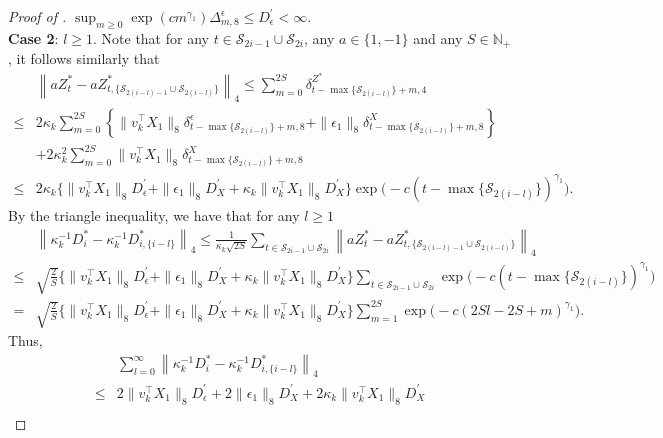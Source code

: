 \documentclass[11pt]{article}
\theoremstyle{plain}
\theoremstyle{definition}
\begin{document}
\begin{proof}[Proof of ]
    $\sup_{m \geq 0}\exp(cm^{\gamma_1})\Delta_{m, 8}^\epsilon \leq D_\epsilon^{\prime} < \infty$.
    \\
    \textbf{Case 2}: $l \geq 1$. Note that for any $t \in \mathcal{S}_{2i-1} \cup \mathcal{S}_{2i}$, any $a \in \{1,-1\}$ and any $S \in \mathbb{N}_+$, it follows similarly that
    \begin{align*}
        &\left\|aZ_{t}^* - aZ_{t, \{\mathcal{S}_{2(i-l)-1} \cup \mathcal{S}_{2(i-l)}\}}^*\right\|_{4} \leq \sum_{m = 0}^{2S}\delta^{Z^*}_{t-\max\{\mathcal{S}_{2(i-l)}\}+m, 4}\\
        \leq& 2\kappa_k\sum_{m = 0}^{2S}\left\{\|v_k^{\top}X_1\|_{8}\delta_{t-\max\{\mathcal{S}_{2(i-l)}\}+m, 8}^{\epsilon} + \|\epsilon_1\|_{8}\delta_{t-\max\{\mathcal{S}_{2(i-l)}\}+m, 8}^{X}\right\}\\
        &+ 2\kappa_k^2\sum_{m = 0}^{2S}\|v^{\top}_kX_1\|_{8}\delta_{t-\max\{\mathcal{S}_{2(i-l)}\}+m, 8}^X\\
        \leq& 2\kappa_k\big\{\|v_k^{\top}X_1\|_{8}D_{\epsilon}^{\prime} + \|\epsilon_1\|_{8}D_X^{\prime} + \kappa_k\|v_k^{\top}X_1\|_{8}D_X^{\prime}\big\}\exp\big(-c(t- \max\{\mathcal{S}_{2(i-l)}\})^{\gamma_1}\big).
    \end{align*}
    By the triangle inequality, we have that for any $l \geq 1$
    \begin{align*}
        &\left\|\kappa_k^{-1}D_{i}^* - \kappa_k^{-1}D_{i, \{i-l\}}^*\right\|_{4} \leq \frac{1}{\kappa_k\sqrt{2S}}\sum_{t \in \mathcal{S}_{2i-1} \cup \mathcal{S}_{2i}}\left\|aZ_{t}^* - aZ_{t, \{\mathcal{S}_{2(i-l)-1} \cup \mathcal{S}_{2(i-l)}\}}^*\right\|_{4}\\
        \leq& \sqrt{\frac{2}{S}}\big\{\|v_k^{\top}X_1\|_{8}D_{\epsilon}^{\prime} + \|\epsilon_1\|_{8}D_X^{\prime} + \kappa_k\|v_k^{\top}X_1\|_{8}D_X^{\prime}\big\}\sum_{t \in \mathcal{S}_{2i-1} \cup \mathcal{S}_{2i}}\exp\big(-c(t- \max\{\mathcal{S}_{2(i-l)}\})^{\gamma_1}\big)\\
        =& \sqrt{\frac{2}{S}}\big\{\|v_k^{\top}X_1\|_{8}D_{\epsilon}^{\prime} + \|\epsilon_1\|_{8}D_X^{\prime} + \kappa_k\|v_k^{\top}X_1\|_{8}D_X^{\prime}\big\}\sum_{m = 1}^{2S}\exp\big(-c(2Sl-2S+m)^{\gamma_1}\big).
    \end{align*}
    Thus,
    \begin{align}\label{eq:sum_fdm_D_i^*}
        &\sum_{l = 0}^{\infty}\left\|\kappa_k^{-1}D_{i}^* - \kappa_k^{-1}D_{i, \{i-l\}}^*\right\|_{4} \nonumber\\
        \leq& 2\|v_k^{\top}X_1\|_{8}D_{\epsilon}^{\prime} + 2\|\epsilon_1\|_{8}D_{X}^{\prime} + 2\kappa_k\|v^{\top}_kX_1\|_{8}D_X^{\prime} \nonumber\\

\end{align}
\end{proof}
\end{document}
